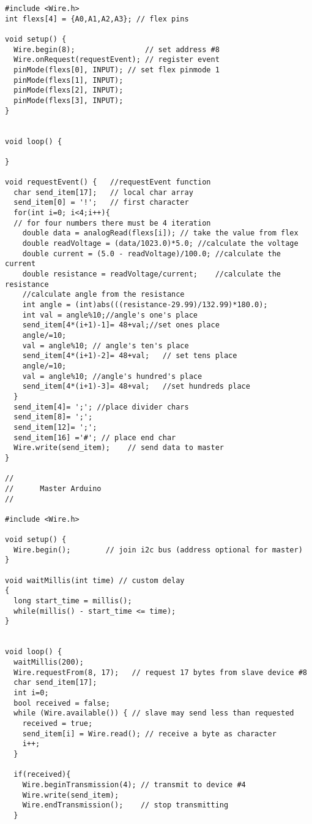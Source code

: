 \documentclass[pdftex,12pt,a4paper]{article}
\begin{document}
\begin{flushleft}
\begin{lstlisting}[language=Arduino]
#include <Wire.h>
int flexs[4] = {A0,A1,A2,A3}; // flex pins

void setup() {
  Wire.begin(8);                // set address #8
  Wire.onRequest(requestEvent); // register event
  pinMode(flexs[0], INPUT); // set flex pinmode 1
  pinMode(flexs[1], INPUT);
  pinMode(flexs[2], INPUT);
  pinMode(flexs[3], INPUT);
}


void loop() {

}

void requestEvent() {   //requestEvent function
  char send_item[17];   // local char array
  send_item[0] = '!';   // first character
  for(int i=0; i<4;i++){    
  // for four numbers there must be 4 iteration 
  	double data = analogRead(flexs[i]); // take the value from flex
    double readVoltage = (data/1023.0)*5.0; //calculate the voltage
    double current = (5.0 - readVoltage)/100.0; //calculate the current
    double resistance = readVoltage/current;    //calculate the resistance
    //calculate angle from the resistance
    int angle = (int)abs(((resistance-29.99)/132.99)*180.0);
    int val = angle%10;//angle's one's place
    send_item[4*(i+1)-1]= 48+val;//set ones place
    angle/=10;  
    val = angle%10; // angle's ten's place
    send_item[4*(i+1)-2]= 48+val;   // set tens place
    angle/=10;  
    val = angle%10; //angle's hundred's place
    send_item[4*(i+1)-3]= 48+val;   //set hundreds place
  }
  send_item[4]= ';'; //place divider chars
  send_item[8]= ';';
  send_item[12]= ';';
  send_item[16] ='#'; // place end char
  Wire.write(send_item);    // send data to master
}

//
//      Master Arduino
//

#include <Wire.h>

void setup() {
  Wire.begin();        // join i2c bus (address optional for master)
}

void waitMillis(int time) // custom delay
{
  long start_time = millis();
  while(millis() - start_time <= time);
}


void loop() {
  waitMillis(200);
  Wire.requestFrom(8, 17);   // request 17 bytes from slave device #8
  char send_item[17];
  int i=0;
  bool received = false;
  while (Wire.available()) { // slave may send less than requested
    received = true;
    send_item[i] = Wire.read(); // receive a byte as character
    i++;
  }
  
  if(received){
    Wire.beginTransmission(4); // transmit to device #4
  	Wire.write(send_item); 
  	Wire.endTransmission();    // stop transmitting
  }


\end{lstlisting}
\end{flushleft}
\end{document}
